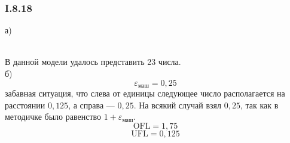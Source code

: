 \subsubsection*{I.8.18}
а)
\begin{figure}[h]
\end{figure}\\
В данной модели удалось представить 23 числа.\\
б) 
$$\varepsilon_{маш} = 0,25$$
забавная ситуация, что слева от единицы следующее число располагается на расстоянии $0,125$, а справа --- $0,25$. На всякий случай взял $0,25$, так как в методичке было равенство $1 + \varepsilon_{маш}$.
$$\text{OFL} = 1,75$$
$$\text{UFL} = 0,125$$